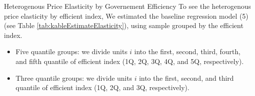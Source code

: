 \documentclass[
  ignorenonframetext,
]{beamer}
\providecommand{\tightlist}{%
  \setlength{\itemsep}{0pt}\setlength{\parskip}{0pt}}
\begin{document}
\begin{frame}{Heterogenous Price Elasticity by Governement Efficiency}
\protect\hypertarget{heterogenous-price-elasticity-by-governement-efficiency}{}
To see the heterogenous price elasticity by efficient index, We
estimated the baseline regression model (5) (see Table
\ref{tab:kableEstimateElasticity}), using sample grouped by the
efficient index.

\begin{itemize}
\tightlist
\item
  Five quantile groups: we divide units \(i\) into the first, second,
  third, fourth, and fifth quantile of efficient index (1Q, 2Q, 3Q, 4Q,
  and 5Q, respectively).
\item
  Three quantile groups: we divide units \(i\) into the first, second,
  and third quantile of efficient index (1Q, 2Q, and 3Q, respectively).
\end{itemize}
\end{frame}
\end{document}
